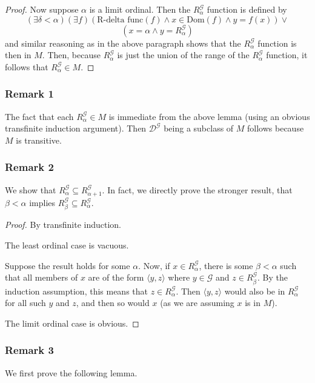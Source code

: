 \documentclass{article}
\theoremstyle{definition}
\begin{document}
\begin{proof}
Now suppose $\alpha$ is a limit ordinal. Then the $R^\mathcal{G}_\alpha$ function is defined by 
\[ (\exists\delta<\alpha)(\exists f)(\textrm{R-delta func}(f)\wedge x\in\textrm{Dom}(f)\wedge y=f(x))\vee \]
\[ (x=\alpha\wedge y=R^\mathcal{G}_\alpha) \]
and similar reasoning as in the above paragraph shows that the $R^\mathcal{G}_\alpha$ function is then in $M$.
Then, because $R^\mathcal{G}_\alpha$ is just the union of the range of the $R^\mathcal{G}_\alpha$ function, it 
follows that $R^\mathcal{G}_\alpha\in M$.

\end{proof}  

\subsubsection*{Remark 1}
The fact that each $R^\mathcal{G}_\alpha\in M$ is immediate from the above lemma (using an obvious transfinite induction 
argument). Then 
$\mathcal{D}^\mathcal{G}$ being a subclass of $M$ follows because $M$ is transitive.

\subsubsection*{Remark 2}
We show that $R^\mathcal{G}_\alpha\subseteq R^\mathcal{G}_{\alpha+1}$. In fact, we directly prove the stronger result, 
that $\beta<\alpha$ implies $R^\mathcal{G}_\beta\subseteq R^\mathcal{G}_\alpha$.

\begin{proof}
By transfinite induction.

The least ordinal case is vacuous.

Suppose the result holds for some $\alpha$. Now, if $x\in R^\mathcal{G}_\alpha$, 
there is some $\beta<\alpha$ such that all members of $x$ are of the form 
$\langle y,z\rangle$ where $y\in\mathcal{G}$ and $z\in R^\mathcal{G}_\beta$. By the induction 
assumption, this means that $z\in R^\mathcal{G}_\alpha$. Then 
$\langle y,z\rangle$ would also be in $R^\mathcal{G}_\alpha$ for all such $y$ and $z$, and then so would 
$x$ (as we are assuming $x$ is in $M$).

The limit ordinal case is obvious.
\end{proof}

\subsubsection*{Remark 3}
We first prove the following lemma.
\end{document}
